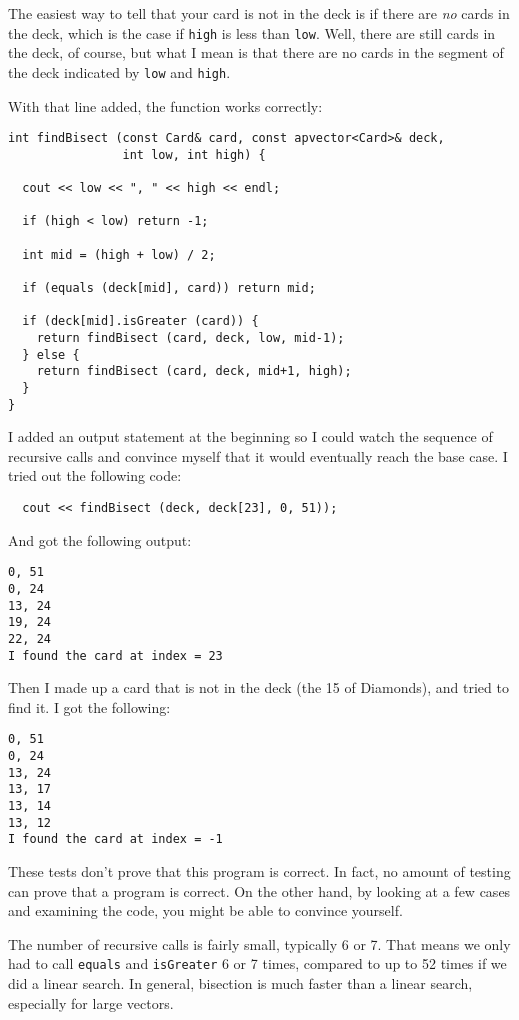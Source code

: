 
The easiest way to tell that your card is not in the deck
is if there are {\em no} cards in the deck, which is the
case if {\tt high} is less than {\tt low}.  Well, there are
still cards in the deck, of course, but what I mean is that
there are no cards in the segment of the deck indicated by
{\tt low} and {\tt high}.

With that line added, the function works correctly:

\begin{verbatim}
int findBisect (const Card& card, const apvector<Card>& deck,
                int low, int high) {

  cout << low << ", " << high << endl;

  if (high < low) return -1;

  int mid = (high + low) / 2;

  if (equals (deck[mid], card)) return mid;

  if (deck[mid].isGreater (card)) {
    return findBisect (card, deck, low, mid-1);
  } else {
    return findBisect (card, deck, mid+1, high);
  }
}
\end{verbatim}
%
I added an output statement at the beginning so I could watch
the sequence of recursive calls and convince myself
that it would eventually reach the base case.  I tried out the
following code:

\begin{verbatim}
  cout << findBisect (deck, deck[23], 0, 51));
\end{verbatim}
%
And got the following output:

\begin{verbatim}
0, 51
0, 24
13, 24
19, 24
22, 24
I found the card at index = 23
\end{verbatim}
%
Then I made up a card that is not in the deck (the 15 of Diamonds),
and tried to find it.  I got the following:

\begin{verbatim}
0, 51
0, 24
13, 24
13, 17
13, 14
13, 12
I found the card at index = -1
\end{verbatim}
%
These tests don't prove that this program is correct.  In fact, no
amount of testing can prove that a program is correct.  On the other
hand, by looking at a few cases and examining the code, you might be
able to convince yourself.


The number of recursive calls is fairly small, typically 6 or 7.  That
means we only had to call {\tt equals} and {\tt isGreater} 6 or 7
times, compared to up to 52 times if we did a linear search.  In
general, bisection is much faster than a linear search, especially for
large vectors.


